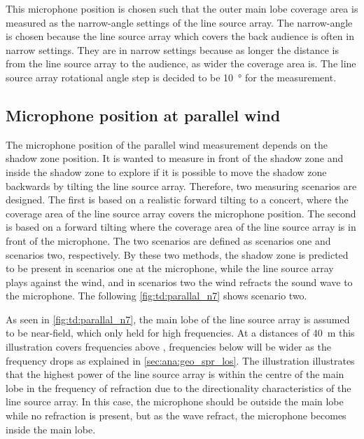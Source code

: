 
This microphone position is chosen such that the outer main lobe coverage area is measured as the narrow-angle settings of the line source array. The narrow-angle is chosen because the line source array which covers the back audience is often in narrow settings. They are in narrow settings because as longer the distance is from the line source array to the audience, as wider the coverage area is. The line source array rotational angle step is decided to be \SI{10}{\degree} for the measurement.


\subsection{Microphone position at parallel wind}\label{tops:mic_pos_par}
The microphone position of the parallel wind measurement depends on the shadow zone position. It is wanted to measure in front of the shadow zone and inside the shadow zone to explore if it is possible to move the shadow zone backwards by tilting the line source array. Therefore, two measuring scenarios are designed.  The first is based on a realistic forward tilting to a concert, where the coverage area of the line source array covers the microphone position. The second is based on a forward tilting where the coverage area of the line source array is in front of the microphone. The two scenarios are defined as scenarios one and scenarios two, respectively.  By these two methods, the shadow zone is predicted to be present in scenarios one at the microphone, while the line source array plays against the wind, and in scenarios two the wind refracts the sound wave to the microphone. The following \autoref{fig:td:parallal_n7} shows scenario two.


As seen in \autoref{fig:td:parallal_n7}, the main lobe of the line source array is assumed to be near-field, which only held for high frequencies. At a distances of \SI{40}{\meter} this illustration covers frequencies above , frequencies below will be wider as the frequency drops as explained in \autoref{sec:ana:geo_spr_los}. The illustration illustrates that the highest power of the line source array is within the centre of the main lobe in the frequency of refraction due to the directionality characteristics of the line source array. In this case, the microphone should be outside the main lobe while no refraction is present, but as the wave refract, the microphone becomes inside the main lobe. 

